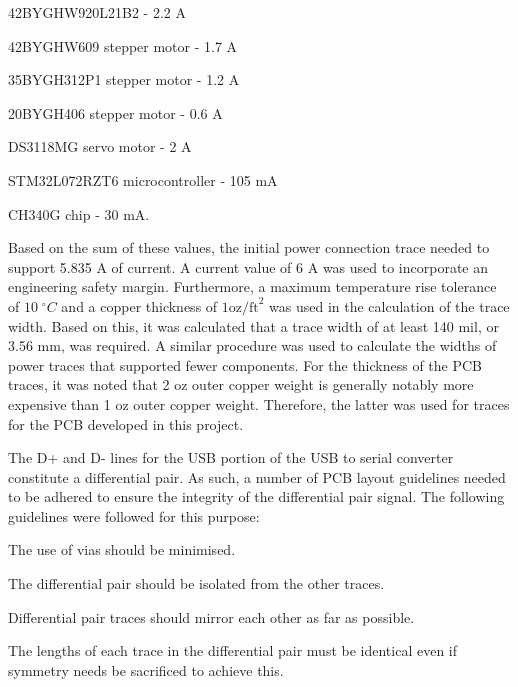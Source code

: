 \begin{compactitem}
	\item 42BYGHW920L21B2 - 2.2 A
	\item 42BYGHW609 stepper motor - 1.7 A
	\item 35BYGH312P1 stepper motor - 1.2 A
	\item 20BYGH406 stepper motor - 0.6 A
	\item DS3118MG servo motor - 2 A
	\item STM32L072RZT6 microcontroller - 105 mA
	\item CH340G chip - 30 mA.
\end{compactitem}

Based on the sum of these values, the initial power connection trace needed to support 5.835 A of current. A current value of 6 A was used to incorporate an engineering safety margin. Furthermore, a maximum temperature rise tolerance of $10\;^{\circ}C$ and a copper thickness of $1 \text{oz/ft}^2$ was used in the calculation of the trace width. Based on this, it was calculated that a trace width of at least 140 mil, or 3.56 mm, was required. A similar procedure was used to calculate the widths of power traces that supported fewer components. For the thickness of the PCB traces, it was noted that 2 oz outer copper weight is generally notably more expensive than 1 oz outer copper weight. Therefore, the latter was used for traces for the PCB developed in this project. 


The D+ and D- lines for the USB portion of the USB to serial converter constitute a differential pair. As such, a number of PCB layout guidelines needed to be adhered to ensure the integrity of the differential pair signal. The following guidelines were followed for this purpose:

\begin{compactitem}
	\item The use of vias should be minimised. 
	\item The differential pair should be isolated from the other traces. 
	\item Differential pair traces should mirror each other as far as possible.
	\item The lengths of each trace in the differential pair must be identical even if symmetry needs be sacrificed to achieve this.
\end{compactitem}

